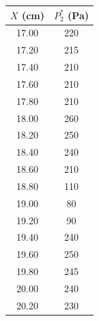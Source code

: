   \centering
  \caption[50 Hz 尾迹扫描数据]{50 Hz}
  \label{tab:exp6_50_Hz}
  \renewcommand{\arraystretch}{1.2}
  \begin{tabular}{cc}
    \toprule
    $X$ (cm) & $P_2^*$ (Pa) \\
    \midrule
    17.00 & 220 \\
    17.20 & 215 \\
    17.40 & 210 \\
    17.60 & 210 \\
    17.80 & 210 \\
    18.00 & 260 \\
    18.20 & 250 \\
    18.40 & 240 \\
    18.60 & 210 \\
    18.80 & 110 \\
    19.00 & 80 \\
    19.20 & 90 \\
    19.40 & 240 \\
    19.60 & 250 \\
    19.80 & 245 \\
    20.00 & 240 \\
    20.20 & 230 \\
    \bottomrule
  \end{tabular}